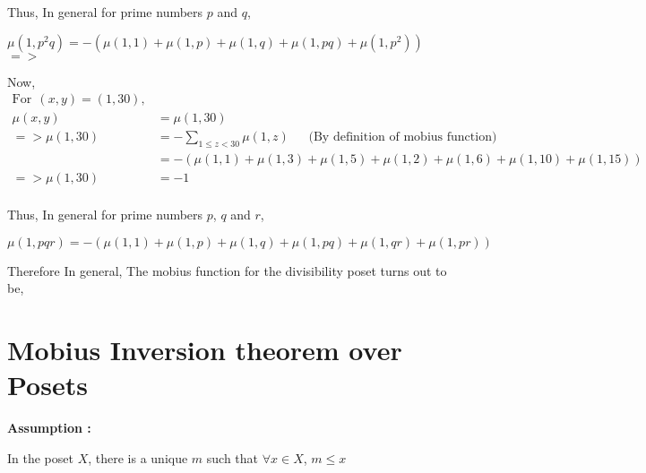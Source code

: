 Thus, In general for prime numbers $p$ and $q$,

\begin{center}
    $\mu(1,p^2 q) = -(\mu(1,1) + \mu(1,p) + \mu(1,q) + \mu(1,p q) + \mu(1,p^2) )$
    \\
    $=>$
\end{center}

\noindent Now,
\begin{align*}
\textrm{For} ~~(x,y) = (1,30),\\
    \mu (x,y) &= \mu (1,30)\\
=>  \mu (1,30) &= -\sum\limits_{1 \le z < 30} \mu(1,z)    ~~~~~~~\textrm{(By definition of mobius function)}\\
    &= - (\mu(1,1) + \mu(1,3) + \mu(1,5) + \mu(1,2) + \mu(1,6) + \mu(1,10) + \mu(1,15)) \\
=>  \mu(1,30) &= -1\\
\end{align*}

Thus, In general for prime numbers $p$, $q$ and $r$,

\begin{center}
    $\mu(1,p q r) = -(\mu(1,1) + \mu(1,p) + \mu(1,q) + \mu(1,p q) + \mu(1,q r) + \mu (1, p r) )$
    \\
\end{center}

Therefore In general, The mobius function for the divisibility poset turns out to be,

\begin{center}
\end{center}

\section{Mobius Inversion theorem over Posets}

\textbf{Assumption :}

\noindent In the poset $X$, there is a unique $m$ such that $\forall x \in X$, $m \le x$

